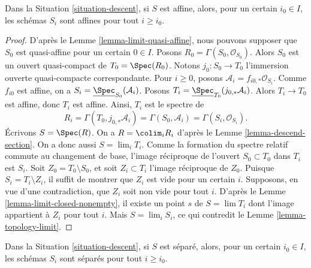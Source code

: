 \begin{lemma}
\label{lemma-limit-affine}
Dans la Situation \ref{situation-descent}, si $S$ est affine, alors, pour
un certain $i_0 \in I$, les schémas $S_i$ sont affines pour tout
$i \geq i_0$.
\end{lemma}

\begin{proof}
D'après le Lemme \ref{lemma-limit-quasi-affine}, nous pouvons supposer que
$S_0$ est quasi-affine pour un certain $0 \in I$. Posons
$R_0 = \Gamma(S_0, \mathcal{O}_{S_0})$. Alors $S_0$ est un ouvert
quasi-compact de $T_0 = \Spec(R_0)$. Notons $j_0 : S_0 \to T_0$
l'immersion ouverte quasi-compacte correspondante. Pour $i \geq 0$, posons
$\mathcal{A}_i = f_{i0, *}\mathcal{O}_{S_i}$. Comme $f_{i0}$ est affine,
on a $S_i = \underline{\Spec}_{S_0}(\mathcal{A}_i)$. Posons
$T_i = \underline{\Spec}_{T_0}(j_{0, *}\mathcal{A}_i)$. Alors
$T_i \to T_0$ est affine, donc $T_i$ est affine. Ainsi, $T_i$ est le spectre
de
$$
R_i = \Gamma(T_0, j_{0, *}\mathcal{A}_i) = \Gamma(S_0, \mathcal{A}_i) =
\Gamma(S_i, \mathcal{O}_{S_i}).
$$
Écrivons $S = \Spec(R)$. On a $R = \colim_i R_i$
d'après le Lemme \ref{lemma-descend-section}. On a donc aussi $S = \lim_i T_i$. Comme la formation du
spectre relatif commute au changement de base, l'image réciproque de
l'ouvert $S_0 \subset T_0$ dans $T_i$ est $S_i$. Soit
$Z_0 = T_0 \setminus S_0$, et soit $Z_i \subset T_i$ l'image réciproque de
$Z_0$. Puisque $S_i = T_i \setminus Z_i$, il suffit de montrer que $Z_i$ est
vide pour un certain $i$. Supposons, en vue d'une contradiction, que $Z_i$
soit non vide pour tout $i$. D'après le
Lemme \ref{lemma-limit-closed-nonempty}, il existe un point $s$ de
$S = \lim T_i$ dont l'image appartient à $Z_i$ pour tout $i$. Mais
$S = \lim_i S_i$, ce qui contredit le Lemme \ref{lemma-topology-limit}.
\end{proof}

\begin{lemma}
\label{lemma-limit-separated}
Dans la Situation \ref{situation-descent}, si $S$ est séparé, alors, pour un
certain $i_0 \in I$, les schémas $S_i$ sont séparés pour tout $i \geq i_0$.
\end{lemma}


